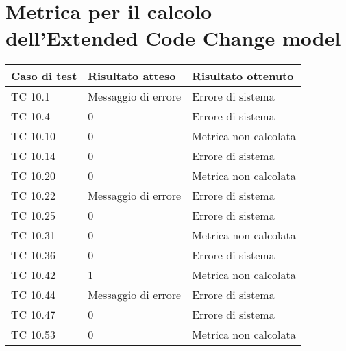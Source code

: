 \section{Metrica per il calcolo dell'Extended Code Change model}
\begin{table}[ht]
	\centering
	\begin{tabular}{| l | l | l |}
		\hline
		\rowcolor{lightgray}\textbf{Caso di test}	&	\textbf{Risultato atteso}	&	\textbf{Risultato ottenuto}	\\
		\hline
		TC 10.1						&	Messaggio di errore		&	Errore di sistema	   	\\
		\hline
		TC 10.4						&	0				&	Errore di sistema	   	\\
		\hline
		TC 10.10					&	0				&	Metrica non calcolata	   	\\
		\hline
		TC 10.14					&	0				&	Errore di sistema	   	\\
		\hline
		TC 10.20					&	0				&	Metrica non calcolata	   	\\
		\hline
		TC 10.22					&	Messaggio di errore		&	Errore di sistema	   	\\
		\hline
		TC 10.25					&	0				&	Errore di sistema	   	\\
		\hline
		TC 10.31					&	0				&	Metrica non calcolata	   	\\
		\hline
		TC 10.36					&	0				&	Errore di sistema	   	\\
		\hline
		TC 10.42					&	1				&	Metrica non calcolata	   	\\
		\hline
		TC 10.44					&	Messaggio di errore		&	Errore di sistema	   	\\
		\hline
		TC 10.47					&	0				&	Errore di sistema	   	\\
		\hline
		TC 10.53					&	0				&	Metrica non calcolata	   	\\
		\hline
	\end{tabular}
\end{table}

